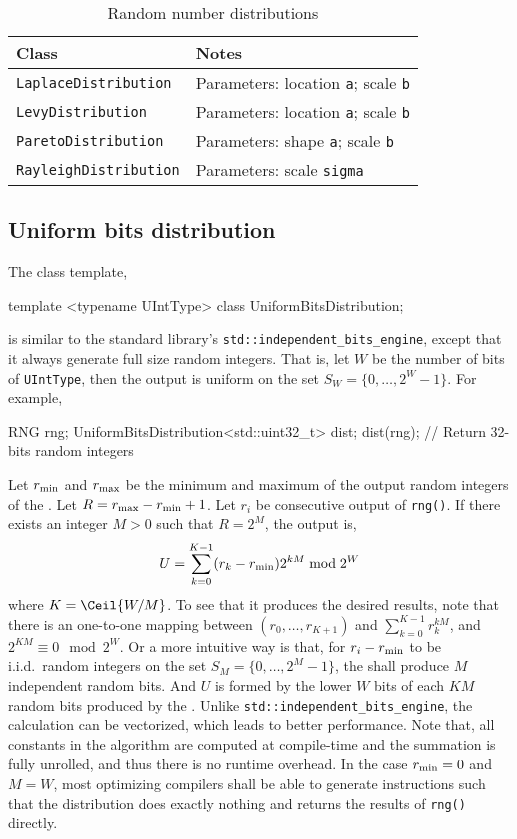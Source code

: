 \begin{table}
  \begin{tabularx}{\textwidth}{lX}
    \toprule
    Class & Notes \\
    \midrule
    \verb|LaplaceDistribution|
    & Parameters: location \verb|a|; scale \verb|b| \\
    \verb|LevyDistribution|
    & Parameters: location \verb|a|; scale \verb|b| \\
    \verb|ParetoDistribution|
    & Parameters: shape \verb|a|; scale \verb|b| \\
    \verb|RayleighDistribution|
    & Parameters: scale \verb|sigma| \\
    \bottomrule
  \end{tabularx}
  \caption{Random number distributions}
  \label{tab:Random number distributions}
\end{table}

\subsection{Uniform bits distribution}
\label{sub:Uniform bits distribution}

The class template,
\begin{cppcode}
  template <typename UIntType>
  class UniformBitsDistribution;
\end{cppcode}
is similar to the standard library's \verb|std::independent_bits_engine|,
except that it always generate full size random integers. That is, let $W$ be
the number of bits of \verb|UIntType|, then the output is uniform on the set
$S_W = \{0,\dots,2^W - 1\}$. For example,
\begin{cppcode}
  RNG rng;
  UniformBitsDistribution<std::uint32_t> dist;
  dist(rng); // Return 32-bits random integers
\end{cppcode}
Let $r_{\mathrm{min}}$ and $r_{\mathrm{max}}$ be the minimum and maximum of the output random
integers of the \rng. Let $R = r_{\mathrm{max}} - r_{\mathrm{min}} + 1$. Let $r_i$ be consecutive
output of \verb|rng()|. If there exists an integer $M > 0$ such that $R = 2^M$,
the output is,
\begin{equation*}
  U = \sum_{k = 0}^{K - 1} (r_k - r_{\mathrm{min}}) 2^{kM} \bmod 2^W
\end{equation*}
where $K = \Ceil{W / M}$. To see that it produces the desired results, note
that there is an one-to-one mapping between $(r_0,\dots,r_{K + 1})$ and
$\sum_{k=0}^{K-1}r_k^{kM}$, and $2^{KM}\equiv0\mod2^W$. Or a more intuitive way
is that, for $r_i - r_{\mathrm{min}}$ to be i.i.d.\ random integers on the set $S_M =
\{0,\dots,2^M - 1\}$, the \rng shall produce $M$ independent random bits. And
$U$ is formed by the lower $W$ bits of each $KM$ random bits produced by the
\rng. Unlike \verb|std::independent_bits_engine|, the calculation can be
vectorized, which leads to better performance. Note that, all constants in the
algorithm are computed at compile-time and the summation is fully unrolled, and
thus there is no runtime overhead. In the case $r_{\mathrm{min}} = 0$ and $M = W$, most
optimizing compilers shall be able to generate instructions such that the
distribution does exactly nothing and returns the results of \verb|rng()|
directly.


